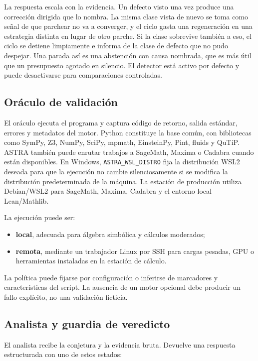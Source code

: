 \documentclass[11pt,a4paper]{article}
\begin{document}
La respuesta escala con la evidencia. Un defecto visto una vez produce una corrección dirigida que lo nombra. La misma clase vista de nuevo se toma como señal de que parchear no va a converger, y el ciclo gasta una regeneración en una estrategia distinta en lugar de otro parche. Si la clase sobrevive también a eso, el ciclo se detiene limpiamente e informa de la clase de defecto que no pudo despejar. Una parada así es una abstención con causa nombrada, que es más útil que un presupuesto agotado en silencio. El detector está activo por defecto y puede desactivarse para comparaciones controladas.

\subsection{Oráculo de validación}

El oráculo ejecuta el programa y captura código de retorno, salida estándar, errores y metadatos del motor. Python constituye la base común, con bibliotecas como SymPy, Z3, NumPy, SciPy, mpmath, EinsteinPy, Pint, fluids y QuTiP. ASTRA también puede enrutar trabajos a SageMath, Maxima o Cadabra cuando están disponibles. En Windows, \texttt{ASTRA\_WSL\_DISTRO} fija la distribución WSL2 deseada para que la ejecución no cambie silenciosamente si se modifica la distribución predeterminada de la máquina. La estación de producción utiliza Debian/WSL2 para SageMath, Maxima, Cadabra y el entorno local Lean/Mathlib.

La ejecución puede ser:

\begin{itemize}
  \item \textbf{local}, adecuada para álgebra simbólica y cálculos moderados;
  \item \textbf{remota}, mediante un trabajador Linux por SSH para cargas pesadas, GPU o herramientas instaladas en la estación de cálculo.
\end{itemize}

La política puede fijarse por configuración o inferirse de marcadores y características del script. La ausencia de un motor opcional debe producir un fallo explícito, no una validación ficticia.

\subsection{Analista y guardia de veredicto}

El analista recibe la conjetura y la evidencia bruta. Devuelve una respuesta estructurada con uno de estos estados:
\end{document}
